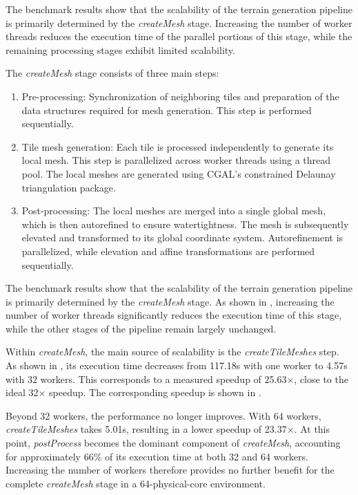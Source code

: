 

The benchmark results show that the scalability of the terrain generation pipeline is primarily determined by the \textit{createMesh} stage. Increasing the number of worker threads reduces the execution time of the parallel portions of this stage, while the remaining processing stages exhibit limited scalability.

The \textit{createMesh} stage consists of three main steps:

\begin{enumerate}
    \item Pre-processing: Synchronization of neighboring tiles and preparation of the data structures required for mesh generation. This step is performed sequentially.
    \item Tile mesh generation: Each tile is processed independently to generate its local mesh. This step is parallelized across worker threads using a thread pool. The local meshes are generated using CGAL's constrained Delaunay triangulation package.
    \item Post-processing: The local meshes are merged into a single global mesh, which is then autoreﬁned to ensure watertightness. The mesh is subsequently elevated and transformed to its global coordinate system. Autorefinement is parallelized, while elevation and affine transformations are performed sequentially.
\end{enumerate}


The benchmark results show that the scalability of the terrain generation pipeline is primarily determined by the \textit{createMesh} stage.
As shown in , increasing the number of worker threads significantly reduces the execution time of this stage, while the other stages of the pipeline remain largely unchanged.

Within \textit{createMesh}, the main source of scalability is the \textit{createTileMeshes} step.
As shown in , its execution time decreases from 117.18s with one worker to 4.57s with 32 workers.
This corresponds to a measured speedup of 25.63$\times$, close to the ideal 32$\times$ speedup.
The corresponding speedup is shown in .

Beyond 32 workers, the performance no longer improves.
With 64 workers, \textit{createTileMeshes} takes 5.01s, resulting in a lower speedup of 23.37$\times$.
At this point, \textit{postProcess} becomes the dominant component of \textit{createMesh}, accounting for approximately 66\% of its execution time at both 32 and 64 workers.
Increasing the number of workers therefore provides no further benefit for the complete \textit{createMesh} stage in a 64-physical-core environment.


